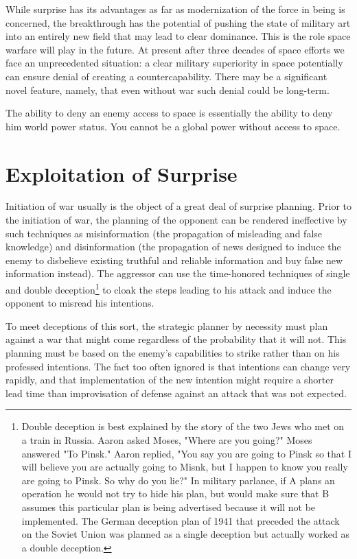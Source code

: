 While surprise has its advantages as far as modernization of the force in being is concerned, the breakthrough has the potential of pushing the state of military art into an entirely new field that may lead to clear dominance. This is the role space warfare will play in the future. At present after three decades of space efforts we face an unprecedented situation: a clear military superiority in space potentially can ensure denial of creating a countercapability. There may be a significant novel feature, namely, that even without war such denial could be long-term.

The ability to deny an enemy access to space is essentially the ability to deny him world power status. You cannot be a global power without access to space.

\section{Exploitation of Surprise}
Initiation of war usually is the object of a great deal of surprise planning. Prior to the initiation of war, the planning of the opponent can be rendered ineffective by such techniques as misinformation (the propagation of misleading and false knowledge) and disinformation (the propagation of news designed to induce the enemy to disbelieve existing truthful and reliable information and buy false new information instead). The aggressor can use the time-honored techniques of single and double deception\footnote{Double deception is best explained by the story of the two Jews who met on a train in Russia. Aaron asked Moses, "Where are you going?" Moses answered "To Pinsk." Aaron replied, "You say you are going to Pinsk so that I will believe you are actually going to Misnk, but I happen to know you really are going to Pinsk. So why do you lie?" 
In military parlance, if A plans an operation he would not try to hide his plan, but would make sure that B assumes this particular plan is being advertised because it will not be implemented. The German deception plan of 1941 that preceded the attack on the Soviet Union was planned as a single deception but actually worked as a double deception.} to cloak the steps leading to his attack and induce the opponent to misread his intentions.

To meet deceptions of this sort, the strategic planner by necessity must plan against a war that might come regardless of the probability that it will not. This planning must be based on the enemy's capabilities to strike rather than on his professed intentions. The fact too often ignored is that intentions can change very rapidly, and that implementation of the new intention might require a shorter lead time than improvisation of defense against an attack that was not expected.

